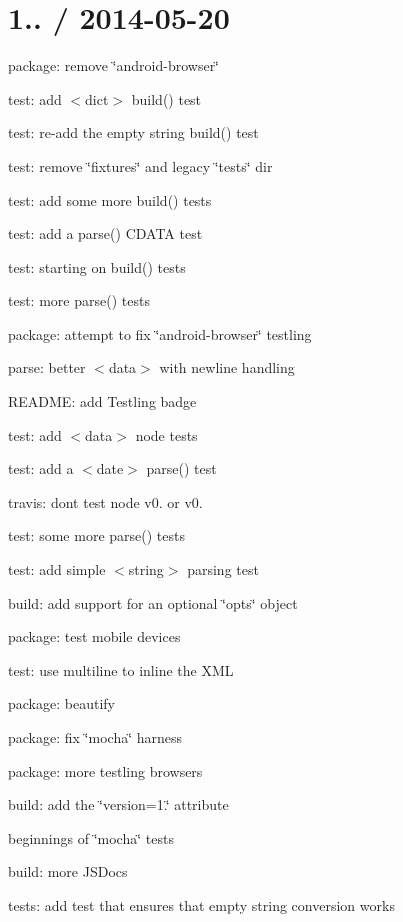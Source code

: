 \section*{1.. / 2014-\/05-\/20 }


\begin{DoxyItemize}
\item package\+: remove \char`\"{}android-\/browser\char`\"{}
\item test\+: add $<$dict$>$ build() test
\item test\+: re-\/add the empty string build() test
\item test\+: remove \char`\"{}fixtures\char`\"{} and legacy \char`\"{}tests\char`\"{} dir
\item test\+: add some more build() tests
\item test\+: add a parse() C\+D\+A\+TA test
\item test\+: starting on build() tests
\item test\+: more parse() tests
\item package\+: attempt to fix \char`\"{}android-\/browser\char`\"{} testling
\item parse\+: better $<$data$>$ with newline handling
\item R\+E\+A\+D\+ME\+: add Testling badge
\item test\+: add $<$data$>$ node tests
\item test\+: add a $<$date$>$ parse() test
\item travis\+: don\textquotesingle{}t test node v0. or v0.
\item test\+: some more parse() tests
\item test\+: add simple $<$string$>$ parsing test
\item build\+: add support for an optional \char`\"{}opts\char`\"{} object
\item package\+: test mobile devices
\item test\+: use multiline to inline the X\+ML
\item package\+: beautify
\item package\+: fix \char`\"{}mocha\char`\"{} harness
\item package\+: more testling browsers
\item build\+: add the \char`\"{}version=1.\char`\"{} attribute
\item beginnings of \char`\"{}mocha\char`\"{} tests
\item build\+: more J\+S\+Docs
\item tests\+: add test that ensures that empty string conversion works

\end{DoxyItemize}

